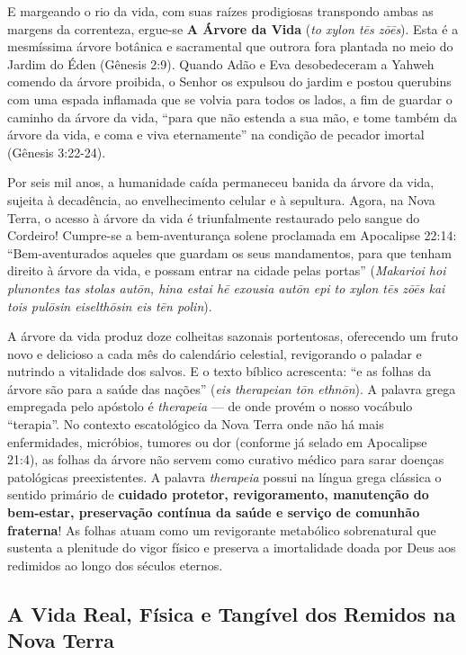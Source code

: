 E margeando o rio da vida, com suas raízes prodigiosas transpondo ambas as margens da correnteza, ergue-se \textbf{A Árvore da Vida} (\textit{to xylon tēs zōēs}).
Esta é a mesmíssima árvore botânica e sacramental que outrora fora plantada no meio do Jardim do Éden (Gênesis 2:9). Quando Adão e Eva desobedeceram a Yahweh comendo da árvore proibida, o Senhor os expulsou do jardim e postou querubins com uma espada inflamada que se volvia para todos os lados, a fim de guardar o caminho da árvore da vida, ``para que não estenda a sua mão, e tome também da árvore da vida, e coma e viva eternamente'' na condição de pecador imortal (Gênesis 3:22-24).

Por seis mil anos, a humanidade caída permaneceu banida da árvore da vida, sujeita à decadência, ao envelhecimento celular e à sepultura.
Agora, na Nova Terra, o acesso à árvore da vida é triunfalmente restaurado pelo sangue do Cordeiro! Cumpre-se a bem-aventurança solene proclamada em Apocalipse 22:14:
``Bem-aventurados aqueles que guardam os seus mandamentos, para que tenham direito à árvore da vida, e possam entrar na cidade pelas portas'' (\textit{Makarioi hoi plunontes tas stolas autōn, hina estai hē exousia autōn epi to xylon tēs zōēs kai tois pulōsin eiselthōsin eis tēn polin}).

A árvore da vida produz doze colheitas sazonais portentosas, oferecendo um fruto novo e delicioso a cada mês do calendário celestial, revigorando o paladar e nutrindo a vitalidade dos salvos.
E o texto bíblico acrescenta: ``e as folhas da árvore são para a saúde das nações'' (\textit{eis therapeian tōn ethnōn}).
A palavra grega empregada pelo apóstolo é \textit{therapeia} — de onde provém o nosso vocábulo ``terapia''.
No contexto escatológico da Nova Terra onde não há mais enfermidades, micróbios, tumores ou dor (conforme já selado em Apocalipse 21:4), as folhas da árvore não servem como curativo médico para sarar doenças patológicas preexistentes. A palavra \textit{therapeia} possui na língua grega clássica o sentido primário de \textbf{cuidado protetor, revigoramento, manutenção do bem-estar, preservação contínua da saúde e serviço de comunhão fraterna}! As folhas atuam como um revigorante metabólico sobrenatural que sustenta a plenitude do vigor físico e preserva a imortalidade doada por Deus aos redimidos ao longo dos séculos eternos.



\subsection{A Vida Real, Física e Tangível dos Remidos na Nova Terra}


